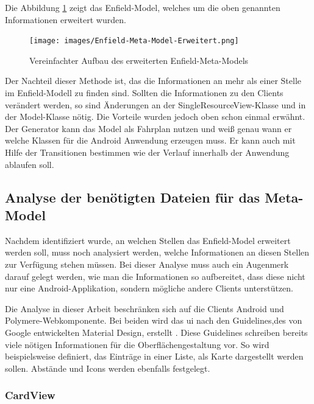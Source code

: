Die Abbildung \ref{fig:enfield-model-extended} zeigt das Enfield-Model, welches um die oben genannten Informationen erweitert wurden.

\begin{figure}[H]
	\begin{center}
		\texttt{[image: images/Enfield-Meta-Model-Erweitert.png]}
		\caption{Vereinfachter Aufbau des erweiterten Enfield-Meta-Models}
		\label{fig:enfield-model-extended}
	\end{center}
\end{figure}

Der Nachteil dieser Methode ist, das die Informationen an mehr als einer Stelle im Enfield-Modell zu finden sind. Sollten die Informationen zu den Clients verändert werden, so sind Änderungen an der SingleResourceView-Klasse und in der Model-Klasse nötig. Die Vorteile wurden jedoch oben schon einmal erwähnt. Der Generator kann das Model als Fahrplan nutzen und weiß genau wann er welche Klassen für die Android Anwendung erzeugen muss. Er kann auch mit Hilfe der Transitionen bestimmen wie der Verlauf innerhalb der Anwendung ablaufen soll.

\subsection{Analyse der benötigten Dateien für das Meta-Model}

Nachdem identifiziert wurde, an welchen Stellen das Enfield-Model erweitert werden soll, muss noch analysiert werden, welche Informationen an diesen Stellen zur Verfügung stehen müssen. Bei dieser Analyse muss auch ein Augenmerk darauf gelegt werden, wie man die Informationen so aufbereitet, dass diese nicht nur eine Android-Applikation, sondern mögliche andere Clients unterstützen.

Die Analyse in dieser Arbeit beschränken sich auf die Clients Android und Polymere-Webkomponente. Bei beiden wird das \acf{ui} nach den Guidelines,des von Google entwickelten Material Design, erstellt \cite{material}. Diese Guidelines schreiben bereits viele nötigen Informationen für die Oberflächengestaltung vor. So wird beispielsweise definiert, das Einträge in einer Liste, als Karte dargestellt werden sollen. Abstände und Icons werden ebenfalls festgelegt.

\subsubsection{CardView}

